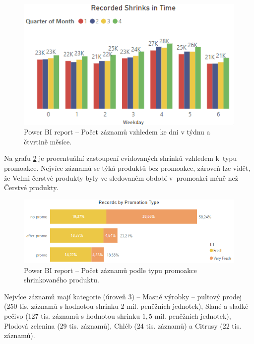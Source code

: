 \begin{figure}[h!]
    \centering
    \captionsetup{justification=centering}
    \includegraphics[width=.6\textwidth]{obrazky/PBI/time.png}
    \caption{Power BI report -- Počet záznamů vzhledem ke dni v týdnu a čtvrtině měsíce.}
    \label{obr:PBI:time}
\end{figure}

Na grafu \ref*{obr:PBI:promo} je procentuální zastoupení evidovaných shrinků vzhledem k~typu promoakce. Nejvíce záznamů se týká produktů bez promoakce, zároveň lze vidět, že Velmi čerstvé  produkty byly ve sledovaném období v~promoakci méně než Čerstvé produkty.

\begin{figure}[h!]
    \centering
    \captionsetup{justification=centering}
    \includegraphics[width=.8\textwidth]{obrazky/PBI/promotype.png}
    \caption{Power BI report -- Počet záznamů podle typu promoakce \\ shrinkovaného produktu.}
    \label{obr:PBI:promo}
\end{figure}

Nejvíce záznamů mají kategorie (úroveň 3) -- Masné výrobky -- pultový prodej (250 tis. záznamů s hodnotou shrinku 2 mil. peněžních jednotek), Slané a sladké pečivo (127 tis. záznamů s hodnotou shrinku $1{,}5$ mil. peněžních jednotek), Plodová zelenina (29 tis. záznamů), Chléb (24 tis. záznamů) a Citrusy (22 tis. záznamů). 

